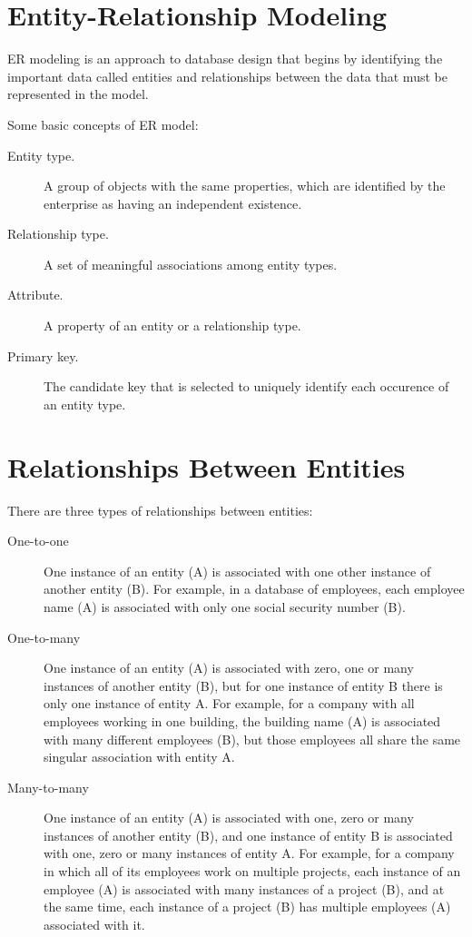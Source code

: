 \documentclass[•]{article}
\begin{document}
\section{Entity-Relationship Modeling\cite{connolly2005database}}
ER modeling is an approach to database design that begins by identifying the important data
called entities and relationships between the data that must be represented in
the model. \par 
Some basic concepts of ER model:
\begin{description}
\item[Entity type.] A group of objects with the same properties, which are identified by the enterprise as having an independent existence.
\item[Relationship type.] A set of meaningful associations among entity types.
\item[Attribute.] A property of an entity or a relationship type.
\item[Primary key.] The candidate key that is selected to uniquely identify each occurence of an entity type.
\end{description}
\section{Relationships Between Entities \cite{beal} }
There are three types of relationships between entities:
\begin{description}
\item[One-to-one]One instance of an entity (A) is associated with one other instance of another entity (B). For example, in a database of employees, each employee name (A) is associated with only one social security number (B).
\item[One-to-many]One instance of an entity (A) is associated with zero, one or many instances of another entity (B), but for one instance of entity B there is only one instance of entity A. For example, for a company with all employees working in one building, the building name (A) is associated with many different employees (B), but those employees all share the same singular association with entity A.
\item[Many-to-many]One instance of an entity (A) is associated with one, zero or many instances of another entity (B), and one instance of entity B is associated with one, zero or many instances of entity A. For example, for a company in which all of its employees work on multiple projects, each instance of an employee (A) is associated with many instances of a project (B), and at the same time, each instance of a project (B) has multiple employees (A) associated with it.
\end{description}


\end{document}
